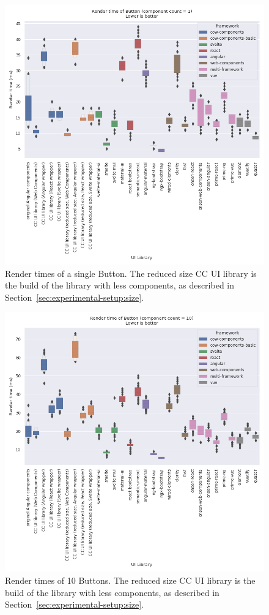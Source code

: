\begin{figure}[h]
  \includegraphics[width=\columnwidth]{plots/render-time-all-1-Button.png}
  \caption{Render times of a single Button. The reduced size CC UI library is the build of the library with less components, as described in Section~\ref{sec:experimental-setup:size}.}
  \label{fig:results:render-time-all-1}
  \centering
\end{figure}

\begin{figure}[h]
  \includegraphics[width=\columnwidth]{plots/render-time-all-10-Button.png}
  \caption{Render times of 10 Buttons. The reduced size CC UI library is the build of the library with less components, as described in Section~\ref{sec:experimental-setup:size}.}
  \label{fig:results:render-time-all-10}
  \centering
\end{figure}

